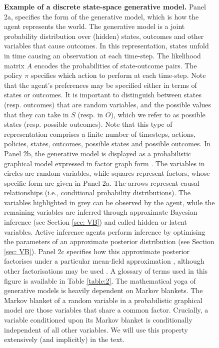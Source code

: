 \documentclass[review,12pt,authoryear]{elsarticle}
\begin{document}
\begin{figure}
    \setcounter{figure}{1}
        \caption{\textbf{Example of a discrete state-space generative model.} Panel 2a, specifies the form of the generative model, which is how the agent represents the world. The generative model is a joint probability distribution over (hidden) states, outcomes and other variables that cause outcomes. In this representation, states unfold in time causing an observation at each time-step. The likelihood matrix $A$ encodes the probabilities of state-outcome pairs. The policy $\pi$ specifies which action to perform at each time-step. Note that the agent's preferences may be specified either in terms of states or outcomes. It is important to distinguish between states (resp. outcomes) that are random variables, and the possible values that they can take in $S$ (resp. in $O$), which we refer to as possible states (resp. possible outcomes). Note that this type of representation comprises a finite number of timesteps, actions, policies, states, outcomes, possible states and possible outcomes. In Panel 2b, the generative model is displayed as a probabilistic graphical model \citep{bishopPatternRecognitionMachine2006,pearlGraphicalModelsProbabilistic1998,jordanIntroductionVariationalMethods1998,pearlProbabilisticReasoningIntelligent1988} expressed in factor graph form \citep{loeligerIntroductionFactorGraphs2004}. The variables in circles are random variables, while squares represent factors, whose specific form are given in Panel 2a. The arrows represent causal relationships (i.e., conditional probability distributions). The variables highlighted in grey can be observed by the agent, while the remaining variables are inferred through approximate Bayesian inference (see Section \ref{sec: VB}) and called hidden or latent variables. Active inference agents perform inference by optimising the parameters of an approximate posterior distribution (see Section \ref{sec: VB}). Panel 2c specifies how this approximate posterior factorises under a particular mean-field approximation \citep{tanakaTheoryMeanField1999}, although other factorisations may be used \citep{parrNeuronalMessagePassing2019,schwobelActiveInferenceBelief2018}. A glossary of terms used in this figure is available in Table \ref{table:2}. The mathematical yoga of generative models is heavily dependent on Markov blankets. The Markov blanket of a random variable in a probabilistic graphical model are those variables that share a common factor. Crucially, a variable conditioned upon its Markov blanket is conditionally independent of all other variables. We will use this property extensively (and implicitly) in the text.}
    \label{fig:gen mod}
\end{figure}
\end{document}
